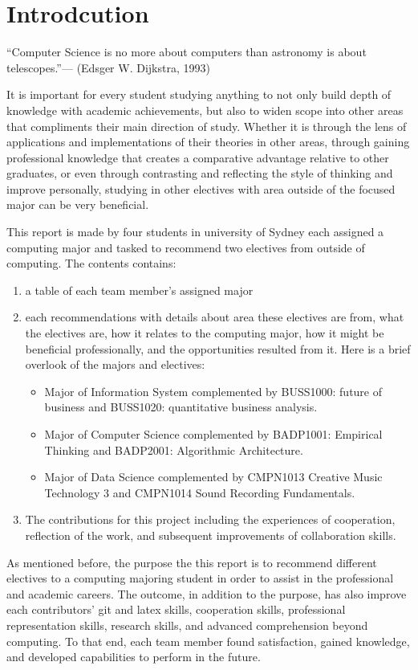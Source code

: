 \documentclass{article}
\begin{document}
\section{Introdcution}
	\begin{displayquote}
	“Computer Science is no more about computers than astronomy is about telescopes.”— (Edsger W. Dijkstra, 1993)
	\end{displayquote}
	It is important for every student studying anything to not only build depth of knowledge with academic achievements, but also to widen scope into other areas that compliments their main direction of study. Whether it is through the 	lens of applications and implementations of their theories in other areas, through gaining professional knowledge that creates a comparative advantage relative to other graduates, or even through contrasting and reflecting the style of thinking and improve personally, studying in other electives with area outside of the focused major can be very beneficial.\par
	This report is made by four students in university of Sydney each assigned a computing major and tasked to recommend two electives from outside of computing. The contents contains:
	\begin{enumerate}
		\item a table of each team member’s assigned major
		\item each recommendations with details about area these electives are from, what the electives are, how it relates to the computing major, how it might be beneficial professionally, and the opportunities resulted from it. Here is a brief overlook of the majors and electives:
		\begin{itemize}
			\item Major of Information System complemented by BUSS1000: future of business and BUSS1020: quantitative business analysis.
			\item Major of Computer Science complemented by BADP1001: Empirical Thinking and BADP2001: Algorithmic Architecture.
			\item Major of Data Science complemented by CMPN1013 Creative Music Technology 3 and CMPN1014 Sound Recording Fundamentals.
		\end{itemize}
		\item The contributions for this project including the experiences of cooperation, reflection of the work, and subsequent improvements of collaboration skills.
	\end{enumerate}
	As mentioned before, the purpose the this report is to recommend different electives to a computing majoring student in order to assist in the professional and academic careers. The outcome, in addition to the purpose, has also improve each contributors’ git and latex skills, cooperation skills, professional representation skills, research skills, and  advanced comprehension beyond computing. To that end, each team member found satisfaction, gained knowledge, and developed capabilities to perform in the future.
\end{document}
